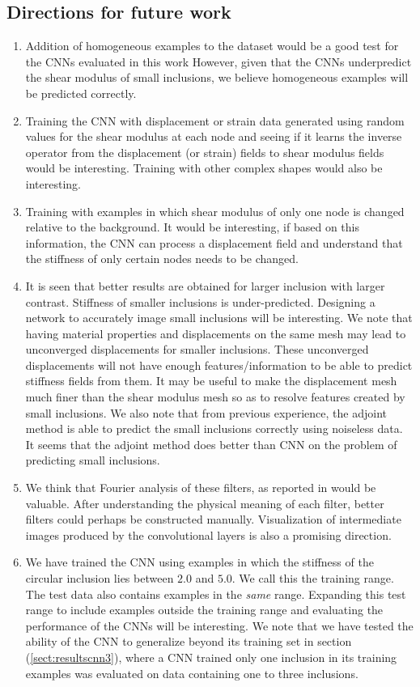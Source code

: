 \documentclass[12pt]{article}
\begin{document}
\subsection{Directions for future work}
\begin{enumerate}
\item{Addition of homogeneous examples to the dataset would be a good test for the CNNs evaluated in this work However, given that the CNNs underpredict the shear modulus of small inclusions, we believe homogeneous examples will be predicted correctly.}
\item{Training the CNN with displacement or strain data generated using random values for the shear modulus at each node and seeing if it learns the inverse operator from the displacement (or strain) fields to shear modulus fields would be interesting. Training with other complex shapes would also be interesting.}
\item{Training with examples in which shear modulus of only one node is changed relative to the background. It would be interesting, if based on this information, the CNN can process a displacement field and understand that the stiffness of only certain nodes needs to be changed.}
\item{It is seen that better results are obtained for larger inclusion with larger contrast. Stiffness of smaller inclusions is under-predicted. Designing a network to accurately image small inclusions will be interesting. We note that having material properties and displacements on the same mesh may lead to unconverged displacements for smaller inclusions. These unconverged displacements will not have enough features/information to be able to predict stiffness fields from them. It may be useful to make the displacement mesh much finer than the shear modulus mesh so as to resolve features created by small inclusions. We also note that from previous experience, the adjoint method \cite{paper:oberai2003} is able to predict the small inclusions correctly using noiseless data. It seems that the adjoint method does better than CNN on the problem of predicting small inclusions.}
\item{We think that Fourier analysis of these filters, as reported in \cite{paper:pateloberai2019} would be valuable. After understanding the physical meaning of each filter, better filters could perhaps be constructed manually. Visualization of intermediate images produced by the convolutional layers is also a promising direction.}
\item{We have trained the CNN using examples in which the stiffness of the circular inclusion lies between $2.0$ and $5.0$. We call this the training range. The test data also contains examples in the \textit{same} range. Expanding this test range to include examples outside the training range and evaluating the performance of the CNNs will be interesting. We note that we have tested the ability of the CNN to generalize beyond its training set in section (\ref{sect:resultscnn3}), where a CNN trained only one inclusion in its training examples was evaluated on data containing one to three inclusions.}

\end{enumerate}
\end{document}
